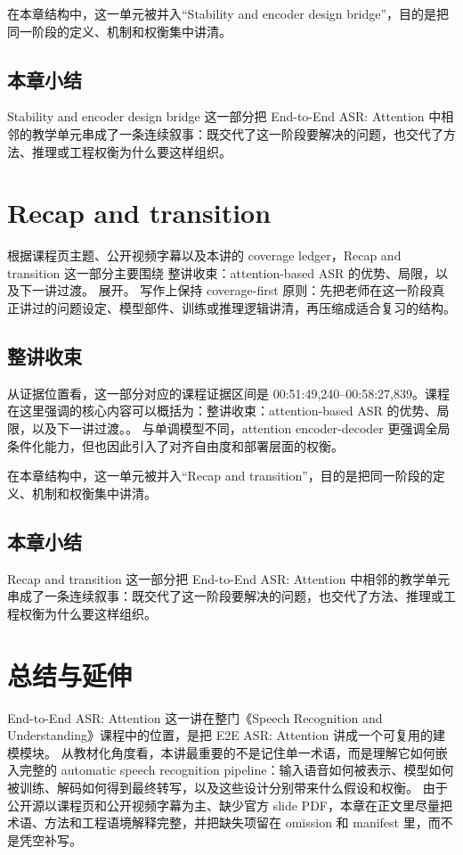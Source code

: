 \documentclass[a4paper]{article}
\begin{document}
在本章结构中，这一单元被并入“Stability and encoder design bridge”，目的是把同一阶段的定义、机制和权衡集中讲清。

\subsection{本章小结}
Stability and encoder design bridge 这一部分把 End-to-End ASR: Attention 中相邻的教学单元串成了一条连续叙事：既交代了这一阶段要解决的问题，也交代了方法、推理或工程权衡为什么要这样组织。

\section{Recap and transition}
根据课程页主题、公开视频字幕以及本讲的 coverage ledger，Recap and transition 这一部分主要围绕 整讲收束：attention-based ASR 的优势、局限，以及下一讲过渡。 展开。
写作上保持 coverage-first 原则：先把老师在这一阶段真正讲过的问题设定、模型部件、训练或推理逻辑讲清，再压缩成适合复习的结构。

\subsection{整讲收束}
从证据位置看，这一部分对应的课程证据区间是 00:51:49,240--00:58:27,839。课程在这里强调的核心内容可以概括为：整讲收束：attention-based ASR 的优势、局限，以及下一讲过渡。。
与单调模型不同，attention encoder-decoder 更强调全局条件化能力，但也因此引入了对齐自由度和部署层面的权衡。

在本章结构中，这一单元被并入“Recap and transition”，目的是把同一阶段的定义、机制和权衡集中讲清。

\subsection{本章小结}
Recap and transition 这一部分把 End-to-End ASR: Attention 中相邻的教学单元串成了一条连续叙事：既交代了这一阶段要解决的问题，也交代了方法、推理或工程权衡为什么要这样组织。

\section{总结与延伸}
End-to-End ASR: Attention 这一讲在整门《Speech Recognition and Understanding》课程中的位置，是把 E2E ASR: Attention 讲成一个可复用的建模模块。
从教材化角度看，本讲最重要的不是记住单一术语，而是理解它如何嵌入完整的 automatic speech recognition pipeline：输入语音如何被表示、模型如何被训练、解码如何得到最终转写，以及这些设计分别带来什么假设和权衡。
由于公开源以课程页和公开视频字幕为主、缺少官方 slide PDF，本章在正文里尽量把术语、方法和工程语境解释完整，并把缺失项留在 omission 和 manifest 里，而不是凭空补写。
\end{document}
